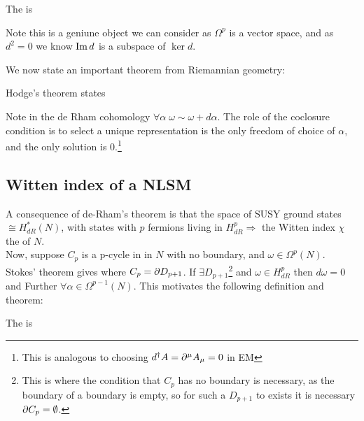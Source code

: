 \documentclass{article}
\begin{document}
\begin{definition}
	The  is 
\end{definition}
\begin{remark}
	Note this is a geniune object we can consider as $\Omega^p$ is a vector space, and as $d^2=0$ we know $\operatorname{Im} d$ is a subspace of $\ker d$. 
\end{remark}
We now state an important theorem from Riemannian geometry:
\begin{theorem}
 Hodge's theorem states 
\end{theorem}
Note in the de Rham cohomology $\forall \alpha \; \omega \sim \omega + d\alpha$. The role of the coclosure condition is to select a unique representation 
is the only freedom of choice of $\alpha$, and the only solution is 0.\footnote{This is analogous to choosing $d^\dagger A = \partial^\mu A_\mu = 0 $ in EM }
\subsection{Witten index of a NLSM}
A consequence of de-Rham's theorem is that the space of SUSY ground states $\cong H_{dR}^\ast (N)$, with states with $p$ fermions living in $H^p_{dR}\Rightarrow$ the Witten index 
$\chi$ the  of $N$. \\
Now, suppose $C_p$ is a p-cycle in in $N$ with no boundary, and $\omega \in \Omega^{p}(N)$. Stokes' theorem gives 
where $C_p = \partial D_{p+1}$. If $\exists D_{p+1}$\footnote{This is where the condition that $C_p$ has no boundary is necessary, as the boundary of a boundary is empty, so for such a $D_{p+1}$ to exists it is necessary $\partial C_p=\emptyset$.} and $\omega \in H_{dR}^p$ then $d\omega = 0$ and
Further $\forall \alpha \in \Omega^{p-1}(N)$.
This motivates the following definition and  theorem:
\begin{definition}
	The  is
\end{definition}
\end{document}
